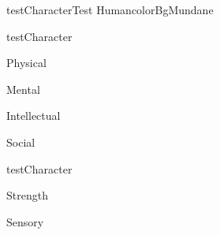 \documentclass{LegrandOrangeTufteBook}
\begin{document}

\begin{actorCardLetterSizeFitToPage}{testCharacter}{Test Human}{colorBgMundane}

	\begin{capabilitiesBox}{testCharacter}
		\begin{capabilitiesTable}{Physical}
		\end{capabilitiesTable}
		\begin{capabilitiesTable}{Mental}
		\end{capabilitiesTable}
		\begin{capabilitiesTable}{Intellectual}
		\end{capabilitiesTable}
		\begin{capabilitiesTable}{Social}
	   \end{capabilitiesTable}
	\end{capabilitiesBox}

	\begin{speciesBonusBox}{testCharacter}
		\begin{bonusTable}{Strength}
		\end{bonusTable}
		\begin{bonusTable}{Sensory}
		\end{bonusTable}
	\end{speciesBonusBox}


\end{actorCardLetterSizeFitToPage}
\end{document}
